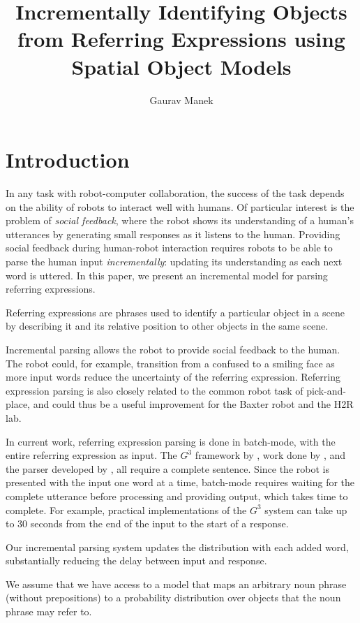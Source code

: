 \documentclass[letterpaper,10pt]{article}
\title{Incrementally Identifying Objects from Referring Expressions using Spatial Object Models}
\author{Gaurav Manek}
\begin{document}
\maketitle


\section{Introduction}

In any task with robot-computer collaboration, the success of the task depends on the ability of robots to interact well with humans. Of particular interest is the problem of \emph{social feedback}, where the robot shows its understanding of a human's utterances by generating small responses as it listens to the human. Providing social feedback during human-robot interaction requires robots to be able to parse the human input \emph{incrementally}: updating its understanding as each next word is uttered. In this paper, we present an incremental model for parsing referring expressions.

Referring expressions are phrases used to identify a particular object in a scene by describing it and its relative position to other objects in the same scene.

Incremental parsing allows the robot to provide social feedback to the human. The robot could, for example, transition from a confused to a smiling face as more input words reduce the uncertainty of the referring expression. Referring expression parsing is also closely related to the common robot task of pick-and-place, and could thus be a useful improvement for the Baxter robot and the H2R lab. 

In current work, referring expression parsing is done in batch-mode, with the entire referring expression as input. The $G^3$ framework by \citet{tellex2011understanding}, work done by \citet{UW_RSE_ICML2012}, and the parser developed by \citet{artzi2013weakly}, all require a complete sentence. Since the robot is presented with the input one word at a time, batch-mode requires waiting for the complete utterance before processing and providing output, which takes time to complete. For example, practical implementations of the $G^3$ system can take up to 30 seconds from the end of the input to the start of a response. 

Our incremental parsing system updates the distribution with each added word, substantially reducing the delay between input and response.

We assume that we have access to a model that maps an arbitrary noun phrase (without prepositions) to a probability distribution over objects that the noun phrase may refer to.
\end{document}
